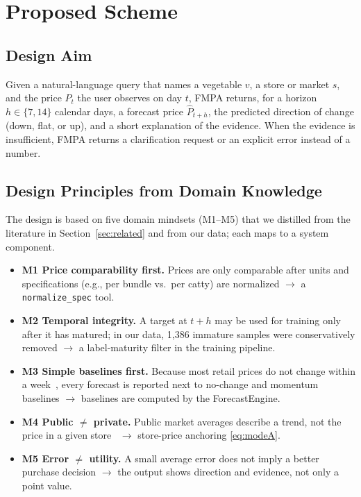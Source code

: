 \section{Proposed Scheme}\label{sec:method}

\subsection{Design Aim}
Given a natural-language query that names a vegetable $v$, a store or market
$s$, and the price $P_t$ the user observes on day $t$, FMPA returns, for a
horizon $h\in\{7,14\}$ calendar days, a forecast price $\hat{P}_{t+h}$, the
predicted direction of change (down, flat, or up), and a short explanation of
the evidence. When the evidence is insufficient, FMPA returns a clarification
request or an explicit error instead of a number.

\subsection{Design Principles from Domain Knowledge}
The design is based on five domain mindsets (M1--M5) that we distilled from
the literature in Section~\ref{sec:related} and from our data; each maps to a
system component.
\begin{itemize}
\item \textbf{M1 Price comparability first.} Prices are only comparable after
units and specifications (e.g., per bundle vs.\ per catty) are normalized
$\rightarrow$ a \texttt{normalize\_spec} tool.
\item \textbf{M2 Temporal integrity.} A target at $t+h$ may be used for
training only after it has matured; in our data, 1{,}386 immature samples were
conservatively removed $\rightarrow$ a label-maturity filter in the training
pipeline.
\item \textbf{M3 Simple baselines first.} Because most retail prices do not
change within a week~\cite{nakamura2008five}, every forecast is reported next
to no-change and momentum baselines $\rightarrow$ baselines are computed by the
ForecastEngine.
\item \textbf{M4 Public $\neq$ private.} Public market averages describe a
trend, not the price in a given store~\cite{meyer2004asymmetric}
$\rightarrow$ store-price anchoring \eqref{eq:modeA}.
\item \textbf{M5 Error $\neq$ utility.} A small average error does not imply a
better purchase decision $\rightarrow$ the output shows direction and evidence,
not only a point value.
\end{itemize}

